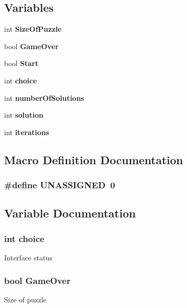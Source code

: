 \subsection*{Variables}
\begin{DoxyCompactItemize}
\item 
int {\bf Size\+Of\+Puzzle}
\item 
bool {\bf Game\+Over}
\item 
bool {\bf Start}
\item 
int {\bf choice}
\item 
int {\bf number\+Of\+Solutions}
\item 
int {\bf solution}
\item 
int {\bf iterations}
\end{DoxyCompactItemize}


\subsection{Macro Definition Documentation}
\subsubsection[{U\+N\+A\+S\+S\+I\+G\+N\+ED}]{\setlength{\rightskip}{0pt plus 5cm}\#define U\+N\+A\+S\+S\+I\+G\+N\+ED~0}\label{sudoku_8h_a7f2a734b84f750bb35708fd8f3d0121e}


\subsection{Variable Documentation}
\subsubsection[{choice}]{\setlength{\rightskip}{0pt plus 5cm}int choice}\label{sudoku_8h_a63bd75f20c553f0d65d7bb29b3f35696}
Interface status 
\subsubsection[{Game\+Over}]{\setlength{\rightskip}{0pt plus 5cm}bool Game\+Over}\label{sudoku_8h_a24624e67404a49abae1a7cc8b96f7add}
Size of puzzle 
